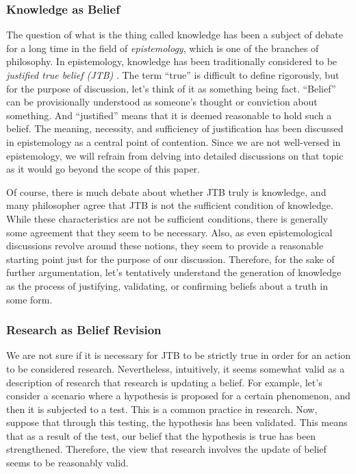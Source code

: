\subsubsection{Knowledge as Belief}
The question of what is the thing called knowledge has been a subject of debate for a long time in the field of \textit{epistemology}, which is one of the branches of philosophy. In epistemology, knowledge has been traditionally considered to be \textit{justified true belief (JTB)} \cite{sep-epistemology}. The term ``true'' is difficult to define rigorously, but for the purpose of discussion, let's think of it as something being fact. ``Belief'' can be provisionally understood as someone's thought or conviction about something. And ``justified'' means that it is deemed reasonable to hold such a belief. The meaning, necessity, and sufficiency of justification has been discussed in epistemology as a central point of contention. Since we are not well-versed in epistemology, we will refrain from delving into detailed discussions on that topic as it would go beyond the scope of this paper.

Of course, there is much debate about whether JTB truly is knowledge, and many philosopher agree that JTB is not the sufficient condition of knowledge. While these characteristics are not be sufficient conditions, there is generally some agreement that they seem to be necessary. Also, as even epistemological discussions revolve around these notions, they seem to provide a reasonable starting point just for the purpose of our discussion. Therefore, for the sake of further argumentation, let's tentatively understand the generation of knowledge as the process of justifying, validating, or confirming beliefs about a truth in some form.

\subsubsection{Research as Belief Revision}
We are not sure if it is necessary for JTB to be strictly true in order for an action to be considered research. Nevertheless, intuitively, it seems somewhat valid as a description of research that research is updating a belief. For example, let's consider a scenario where a hypothesis is proposed for a certain phenomenon, and then it is subjected to a test. This is a common practice in research. Now, suppose that through this testing, the hypothesis has been validated. This means that as a result of the test, our belief that the hypothesis is true has been strengthened. Therefore, the view that research involves the update of belief seems to be reasonably valid.

